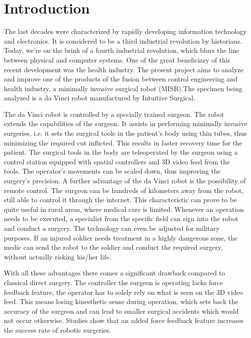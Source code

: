 
%
	
\chapter{Introduction}

The last decades were characterized by rapidly developing information technology and electronics. It is considered to be a third industrial revolution by historians. Today, we're on the brink of a fourth industrial revolution, which blurs the line between physical and computer systems. One of the great beneficiary of this recent development was the health industry. The present project aims to analyze and improve one of the products of the fusion between control engineering and health industry, a minimally invasive surgical robot (MISR).The specimen being analyzed is a da Vinci robot manufactured by Intuitive Surgical.

The da Vinci robot is controlled by a specially trained surgeon. The robot extends the capabilities of the surgeon. It assists in performing minimally invasive surgeries, i.e. it sets the surgical tools in the patient's body using thin tubes, thus minimizing the required cut inflicted. This results in faster recovery time for the patient. The surgical tools in the body are teleoperated by the surgeon using a control station equipped with spatial controllers and 3D video feed from the tools. The operator's movements can be scaled down, thus improving the surgery's precision. A further advantage of the da Vinci robot is the possibility of remote control. The surgeon can be hundreds of kilometers away from the robot, still able to control it through the internet. This characteristic can prove to be quite useful in rural areas, where medical care is limited. Whenever an operation needs to be executed, a specialist from the specific field can sign into the robot and conduct a surgery. The technology can even be adjusted for military purposes. If an injured soldier needs treatment in a highly dangerous zone, the medic can send the robot to the soldier and conduct the required surgery, without actually risking his/her life.

With all these advantages there comes a significant drawback compared to classical direct surgery. The controller the surgeon is operating lacks force feedback feature, the operator has to solely rely on  what is seen on the 3D video feed. This means losing kinesthetic sense during operation, which sets back the accuracy of the surgeon and can lead to smaller surgical accidents which would not occur otherwise. Studies show that an added force feedback feature increases the success rate of robotic surgeries.

